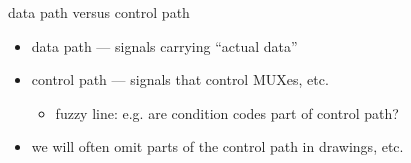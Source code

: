 \begin{frame}{data path versus control path}
\begin{itemize}
    \item data path --- signals carrying ``actual data''
    \item control path --- signals that control MUXes, etc.
        \begin{itemize}
        \item fuzzy line: e.g. are condition codes part of control path?
        \end{itemize}
    \vspace{.5cm}
    \item we will often omit parts of the control path in drawings, etc.
\end{itemize}
\end{frame}
